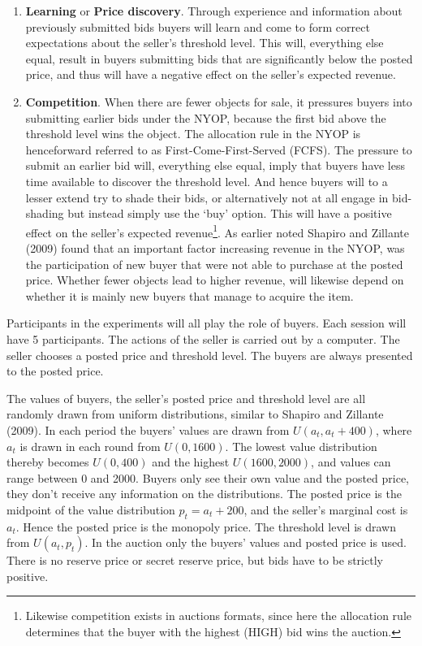 \documentclass[a4paper,12pt]{article}
\begin{document}
	\begin{enumerate}
		\item {\bf Learning} or {\bf Price discovery}. Through experience and information about previously submitted bids buyers will learn and come to form correct expectations about the seller's threshold level. This will, everything else equal, result in buyers submitting bids that are significantly below the posted price, and thus will have a negative effect on the seller's expected revenue.
	 	\item {\bf Competition}. When there are fewer objects for sale, it pressures buyers into submitting earlier bids under the NYOP, because the first bid above the threshold level wins the object. The allocation rule in the NYOP is henceforward referred to as First-Come-First-Served (FCFS). The pressure to submit an earlier bid will, everything else equal, imply that buyers have less time available to discover the threshold level. And hence buyers will to a lesser extend try to shade their bids, or alternatively not at all engage in bid-shading but instead simply use the `buy' option. This will have a positive effect on the seller's expected revenue\footnote{Likewise competition exists in auctions formats, since here the allocation rule determines that the buyer with the highest (HIGH) bid wins the auction.}. As earlier noted Shapiro and Zillante (2009) found that an important factor increasing revenue in the NYOP, was the participation of new buyer that were not able to purchase at the posted price. Whether fewer objects lead to higher revenue, will likewise depend on whether it is mainly new buyers that manage to acquire the item.
	\end{enumerate}

	Participants in the experiments will all play the role of buyers. Each session will have 5 participants. The actions of the seller is carried out by a computer. The seller chooses a posted price and threshold level. The buyers are always presented to the posted price.

	The values of buyers, the seller's posted price and threshold level are all randomly drawn from uniform distributions, similar to Shapiro and Zillante (2009). In each period the buyers' values are drawn from $U(a_t , a_t + 400)$, where $a_t$ is drawn in each round from $U(0, 1600)$. The lowest value distribution thereby becomes $U(0, 400)$ and the highest $U(1600, 2000)$, and values can range between 0 and 2000. Buyers only see their own value and the posted price, they don't receive any information on the distributions. The posted price is the midpoint of the value distribution $p_t = a_t + 200$, and the seller's marginal cost is $a_t$. Hence the posted price is the monopoly price. The threshold level is drawn from $U(a_t, p_t)$. In the auction only the buyers' values and posted price is used. There is no reserve price or secret reserve price, but bids have to be strictly positive.
\end{document}
